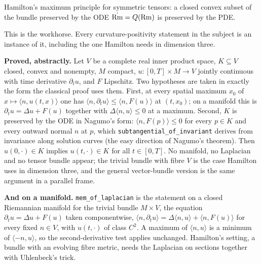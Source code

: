 \begin{theorem}
  \label{thm:max-tensor}
  \leanok
  Hamilton's maximum principle for symmetric tensors: a closed convex subset of
  the bundle preserved by the ODE $\dot{\operatorname{Rm}} = Q(\operatorname{Rm})$ is preserved by the PDE.

  This is the workhorse. Every curvature-positivity statement in the subject is
  an instance of it, including the one Hamilton needs in dimension three.

  \textbf{Proved, abstractly.} Let $V$ be a complete real inner product space,
  $K \subseteq V$ closed, convex and nonempty, $M$ compact, $u : [0,T] \times M
  \to V$ jointly continuous with time derivative $\partial_t u$, and $F$
  Lipschitz. Two hypotheses are taken in exactly the form the classical proof
  uses them. First, at every spatial maximum $x_0$ of $x \mapsto \langle n,
  u(t,x)\rangle$ one has $\langle n, \partial_t u\rangle \le \langle n,
  F(u)\rangle$ at $(t,x_0)$; on a manifold this is $\partial_t u = \Delta u +
  F(u)$ together with $\Delta \langle n, u\rangle \le 0$ at a maximum. Second,
  $K$ is preserved by the ODE in Nagumo's form: $\langle n, F(p)\rangle \le 0$
  for every $p \in K$ and every outward normal $n$ at $p$, which
  \texttt{subtangential\_of\_invariant} derives from invariance along solution
  curves (the easy direction of Nagumo's theorem). Then $u(0,\cdot) \in K$
  implies $u(t,\cdot) \in K$ for all $t \in [0,T]$. No manifold, no Laplacian
  and no tensor bundle appear; the trivial bundle with fibre $V$ is the case
  Hamilton uses in dimension three, and the general vector-bundle version is the
  same argument in a parallel frame.

  \textbf{And on a manifold.} \texttt{mem\_of\_laplacian} is the statement on
  a closed Riemannian manifold for the trivial bundle $M \times V$, the equation
  $\partial_t u = \Delta u + F(u)$ taken componentwise, $\langle n,
  \partial_t u\rangle = \Delta\langle n, u\rangle + \langle n, F(u)\rangle$
  for every fixed $n \in V$, with $u(t,\cdot)$ of class $C^2$. A maximum of
  $\langle n, u\rangle$ is a minimum of $\langle -n, u\rangle$, so the
  second-derivative test applies unchanged. Hamilton's setting, a bundle with
  an evolving fibre metric, needs the Laplacian on sections together with
  Uhlenbeck's trick.


\end{theorem}
